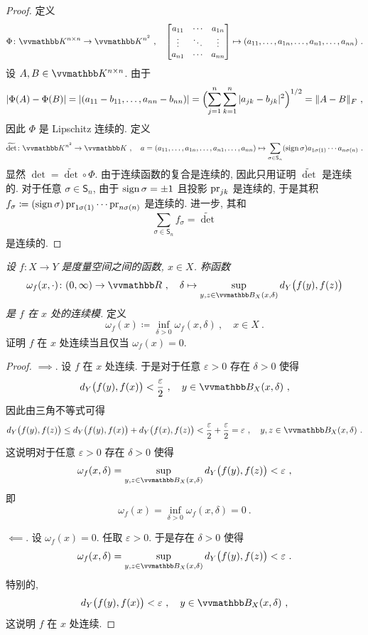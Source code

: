 \begin{proof}
    定义
    \[
        \Phi \colon \K^{n \times n} \to \K^{n^2}\ ,\quad
        \begin{bmatrix}
            a_{1 1} & \cdots & a_{1 n} \\
            \vdots  & \ddots & \vdots  \\
            a_{n 1} & \cdots & a_{n n}
        \end{bmatrix}
        \mapsto (a_{1 1}, \ldots, a_{1 n}, \ldots, a_{n 1}, \ldots, a_{n n})\ .
    \]
    设 \(A, B \in \K^{n \times n}\). 由于
    \[
        |\Phi(A) - \Phi(B)| = |(a_{1 1} - b_{1 1}, \ldots, a_{n n} - b_{n n})| = \Bigl(\sum_{j = 1}^n \sum_{k = 1}^n |a_{j k} - b_{j k}|^2\Bigr)^{1 / 2} = \|A - B\|_F\ ,
    \]
    因此 \(\Phi\) 是 Lipschitz 连续的. 定义
    \[
        \widetilde \det \colon \K^{n^2} \to \K\ ,\quad a = (a_{1 1}, \ldots, a_{1 n}, \ldots, a_{n 1}, \ldots, a_{n n}) \mapsto \sum_{\sigma \in \mathsf S_n} (\sign \sigma) a_{1 \sigma(1)} \cdots a_{n \sigma(n)}\ .
    \]
    显然 \(\det = \widetilde \det \circ \Phi\). 由于连续函数的复合是连续的, 因此只用证明 \(\widetilde \det\) 是连续的. 对于任意 \(\sigma \in \mathsf S_n\), 由于 \(\operatorname{sign} \sigma = \pm 1\) 且投影 \(\operatorname{pr}_{j k}\) 是连续的, 于是其积 \(f_\sigma \coloneqq (\operatorname{sign} \sigma) \operatorname{pr}_{1 \sigma(1)} \cdots \operatorname{pr}_{n \sigma(n)}\) 是连续的. 进一步, 其和
    \[
        \sum_{\sigma \in \mathsf S_n} f_\sigma = \widetilde \det
    \]
    是连续的.
\end{proof}

\begin{exercise}
    \textsl{设 \(f \colon X \to Y\) 是度量空间之间的函数, \(x \in X\). 称函数
    \[
        \omega_f(x, \cdot) \colon (0, \infty) \to \R\ ,\quad \delta \mapsto \sup_{y, z \in \B_X(x, \delta)} d_Y\bigl(f(y), f(z)\bigr)
    \]
    是 \(f\) 在 \(x\) 处的连续模.} 定义
    \[
        \omega_f(x) \coloneqq \inf_{\delta > 0} \omega_f(x, \delta)\ ,\quad x \in X\ .
    \]
    证明 \(f\) 在 \(x\) 处连续当且仅当 \(\omega_f(x) = 0\).
\end{exercise}

\begin{proof}
    \(\implies\). 设 \(f\) 在 \(x\) 处连续. 于是对于任意 \(\varepsilon > 0\) 存在 \(\delta > 0\) 使得
    \[
        d_Y \bigl(f(y), f(x)\bigr) < \frac{\varepsilon}{2}\ ,\quad y \in \B_X(x, \delta)\ ,
    \]
    因此由三角不等式可得
    \[
        d_Y \bigl(f(y), f(z)\bigr) \leq d_Y \bigl(f(y), f(x)\bigr) + d_Y \bigl(f(x), f(z)\bigr) < \frac{\varepsilon}{2} + \frac{\varepsilon}{2} = \varepsilon\ ,\quad y, z \in \B_X(x, \delta)\ .
    \]
    这说明对于任意 \(\varepsilon > 0\) 存在 \(\delta > 0\) 使得
    \[
        \omega_f(x, \delta) = \sup_{y, z \in \B_X(x, \delta)} d_Y\bigl(f(y), f(z)\bigr) < \varepsilon\ ,
    \]
    即
    \[
        \omega_f(x) = \inf_{\delta > 0} \omega_f(x, \delta) = 0\ .
    \]

    \(\impliedby\). 设 \(\omega_f(x) = 0\). 任取 \(\varepsilon > 0\). 于是存在 \(\delta > 0\) 使得
    \[
        \omega_f(x, \delta) = \sup_{y, z \in \B_X(x, \delta)} d_Y\bigl(f(y), f(z)\bigr) < \varepsilon\ .
    \]
    特别的,
    \[
        d_Y\bigl(f(y), f(x)\bigr) < \varepsilon\ ,\quad y \in \B_X(x, \delta)\ ,
    \]
    这说明 \(f\) 在 \(x\) 处连续.
\end{proof}

